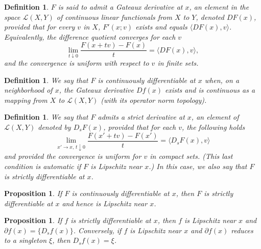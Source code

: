 \documentclass[12pt]{amsart}
\numberwithin{equation}{section}
\newtheorem{proposition}[theorem]{Proposition}
\newtheorem{definition}[theorem]{Definition}
\begin{document}
\begin{definition}
$F$ is said to admit a Gateaux derivative at $x$, an element in the space $\mathscr{L}(X,Y)$ of continuous linear functionals from $X$ to $Y$, denoted $DF(x)$, provided that for every $v$ in $X$, $F'(x;v)$ exists and equals $\langle DF(x),v\rangle$. Equivalently, the difference quotient converges for each $v$
\begin{equation*}
    \lim\limits_{t\downarrow 0} \frac{F(x+tv) - F(x)}{t} = \langle DF(x), v\rangle,
\end{equation*}
and the convergence is uniform with respect to $v$ in finite sets. 
\end{definition}

\begin{definition}\label{def: cont diff}
We say that $F$ is continuously differentiable at $x$ when, on a neighborhood of $x$, the Gateaux derivative $Df(x)$ exists and is continuous as a mapping from $X$ to $\mathscr{L}(X,Y)$ (with its operator norm topology).
\end{definition}

\begin{definition}\label{def: stric deriv}
We say that $F$ admits a strict derivative at $x$, an element of $\mathscr{L}(X,Y)$ denoted by $D_s F(x)$, provided that for each $v$, the following holds
\begin{equation*}
    \lim\limits_{x'\to x,\, t\downarrow 0} \frac{F(x'+tv) - F(x')}{t} = \langle D_s F(x),v\rangle
\end{equation*}
and provided the convergence is uniform for $v$ in compact sets. (This last condition is automatic if $F$ is Lipschitz near $x$.) In this case, we also say that $F$ is strictly differentiable at $x$.
\end{definition}

\begin{proposition}\label{prop:diff}
If $F$ is continuously differentiable at $x$, then $F$ is strictly differentiable at $x$ and hence is Lipschitz near $x$.
\end{proposition}

\begin{proposition}
If $f$ is strictly differentiable at $x$, then $f$ is Lipschitz near $x$ and $\partial f(x) = \{D_s f(x)\}$. Conversely, if $f$ is Lipschitz near $x$ and $\partial f(x)$ reduces to a singleton $\xi$, then $D_s f(x) = \xi$.
\end{proposition}
\end{document}
